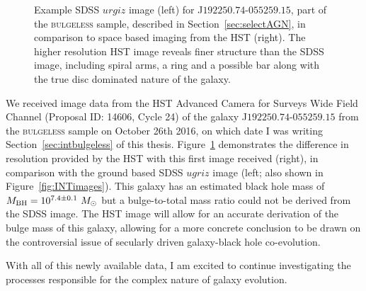 \begin{figure}[t]
\caption[Example HST image data in comparison to SDSS]{Example SDSS $urgiz$ image (left) for J$192250.74$-$055259.15$, part of the \textsc{bulgeless} sample, described in Section~\ref{sec:selectAGN}, in comparison to space based imaging from the HST (right). The higher resolution HST image reveals finer structure than the SDSS image, including spiral arms, a ring and a possible bar along with the true disc dominated nature of the galaxy.}
\label{fig:hstdata}
\end{figure}


We received image data from the HST Advanced Camera for Surveys Wide Field Channel (Proposal ID: 14606, Cycle 24) of the galaxy J$192250.74$-$055259.15$ from the \textsc{bulgeless} sample on October 26th 2016, on which date I was writing Section~\ref{sec:intbulgeless} of this thesis. Figure~\ref{fig:hstdata} demonstrates the difference in resolution provided by the HST with this first image received (right), in comparison with the ground based SDSS $ugriz$ image (left; also shown in Figure~\ref{fig:INTimages}). This galaxy has an estimated black hole mass of $M_{\rm{BH}} = 10^{7.4\pm0.1}~M_{\odot}$ but a bulge-to-total mass ratio could not be derived from the SDSS image. The HST image will allow for an accurate derivation of the bulge mass of this galaxy, allowing for a more concrete conclusion to be drawn on the controversial issue of secularly driven galaxy-black hole co-evolution. 

With all of this newly available data, I am excited to continue investigating the processes responsible for the complex nature of galaxy evolution. 

